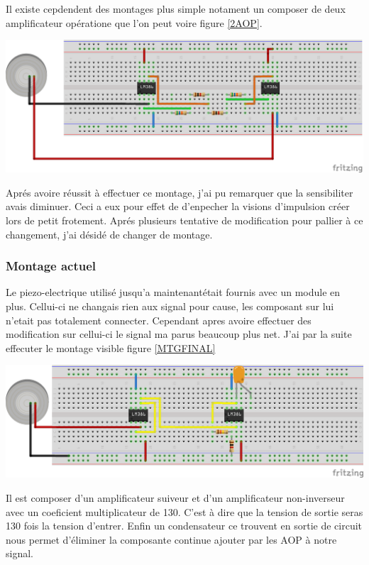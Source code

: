 \documentclass[11pt,french,a4paper]{article}
\begin{document}
Il existe cepdendent des montages plus simple notament un composer de deux amplificateur opératione que l'on peut voire figure \ref{2AOP}.
\\

\begin{center}	
\includegraphics[scale=0.80]{../img/instrumentation2aop_bb.png}
\label{2AOP}
\end{center}

Aprés avoire réussit à effectuer ce montage, j’ai pu remarquer que la sensibiliter avais diminuer. Ceci a eux pour effet de d’enpecher la visions d’impulsion créer lors de petit frotement. Aprés plusieurs tentative de modification pour pallier à ce changement, j’ai désidé de changer de montage.

\subsubsection{Montage actuel}
Le piezo-electrique utilisé jusqu’a maintenantétait fournis avec un module en plus. Cellui-ci ne changais rien aux signal pour cause, les composant sur lui n’etait pas totalement connecter. Cependant apres avoire effectuer des modification sur cellui-ci le signal ma parus beaucoup plus net.
J’ai par la suite effecuter le montage visible figure \ref{MTGFINAL}
\\
\begin{center}	
\includegraphics[scale=0.85]{../img/mtgfinal.png}
\label{MTGFINAL}
\end{center}
Il est composer d’un amplificateur suiveur et d’un amplificateur non-inverseur avec un coeficient multiplicateur de 130. C'est à dire que la tension de sortie seras 130 fois la tension d'entrer. Enfin un condensateur ce trouvent en sortie de circuit nous permet d’éliminer la composante continue ajouter par les AOP à notre signal.
\end{document}
